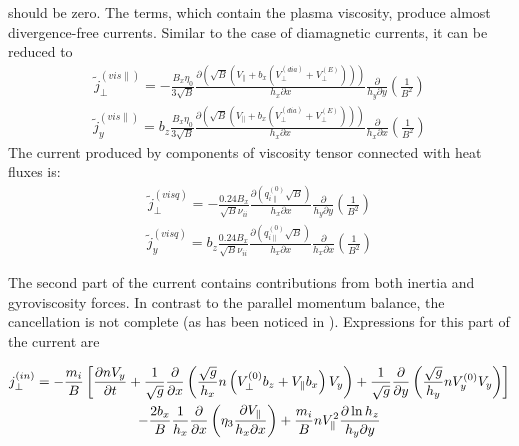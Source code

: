 \documentclass[a4paper,10pt]{report}
\begin{document}
should be zero.
The terms, which contain the plasma viscosity, produce almost
divergence-free currents.
Similar to the case of diamagnetic currents, it can be reduced
to
\begin{gather}
\tilde{j}_{\perp}^{\left( vis \parallel \right)} =
- \frac{B_x \eta _0}{3 \sqrt{B}}
\frac{\partial\left(\sqrt{B}\left(V_{\parallel}+b_x \left(V^{(dia)}_{\perp} + V^{(E)}_{\perp}\right)\right)\right)}
{h_x \partial x}
\frac{\partial}{h_y \partial y}
\left(\frac{1}{B^2}\right)
\end{gather}
\begin{gather}
\tilde{j}_y^{\left( vis \parallel \right)} =
b_z\frac{B_x \eta _0}{3 \sqrt{B}}
\frac{\partial\left(\sqrt{B}\left(V_{\parallel}+b_x \left(V^{(dia)}_{\perp} + V^{(E)}_{\perp}\right)\right)\right)}
{h_x \partial x}
\frac{\partial}{h_x \partial x}
\left(\frac{1}{B^2}\right)
\end{gather}
The current produced by components of viscosity tensor connected
with heat fluxes is:
\begin{gather}
\tilde{j}_{\perp}^{\left( vis q \right)} =
- \frac{0.24 B_x}{\sqrt{B} \nu_{ii}}\frac{\partial
\left(q_{i \parallel}^{\left( 0 \right)} \sqrt{B}\right)}{h_x \partial x}
\frac{\partial}{h_y \partial y}
\left(\frac{1}{B^2}\right)
\end{gather}
\begin{gather}
\tilde{j}_y^{\left( vis q \right)} =
b_z\frac{0.24 B_x}{\sqrt{B} \nu_{ii}}\frac{\partial
\left(q_{i \parallel}^{\left( 0 \right)} \sqrt{B}\right)}{h_x \partial x}
\frac{\partial}{h_x \partial x}
\left(\frac{1}{B^2}\right)
\end{gather}

The second part of the current contains contributions from both inertia
and gyroviscosity forces. In contrast to the parallel momentum balance,
the cancellation is not complete (as has been noticed in
\cite{HINTON94C}). Expressions
for this part of the current are

\begin{multline}
\hfill j_{\perp}^{\left(in\right)}= - \frac{m_i}{B}
\left[\frac{\partial n V_{y}}{\partial t} +
     \frac{1}{\sqrt{g}} \frac{\partial }{\partial x}
      \left(\frac{\sqrt{g}}{h_x} n\left(V_{\perp}^{\left( 0 \right)} b_z
+ V_{\parallel} b_x \right) V_{y}\right)+
     \frac{1}{\sqrt{g}} \frac{\partial }{\partial y}
      \left(\frac{\sqrt{g}}{h_y} n V_y^{\left( 0 \right)} V_{y}\right)
\right] \hfill \\
\hfill -
\frac{2 b_x}{B} \frac{1}{h_x}\frac{\partial}{\partial x}
\left(\eta_3
\frac{\partial V_{\parallel}}{h_x \partial x}\right)+
\frac{m_i}{B} n V_{\parallel}^2 \frac{\partial \ln h_z}{h_y \partial y}
\hfill
\end{multline}
\end{document}
